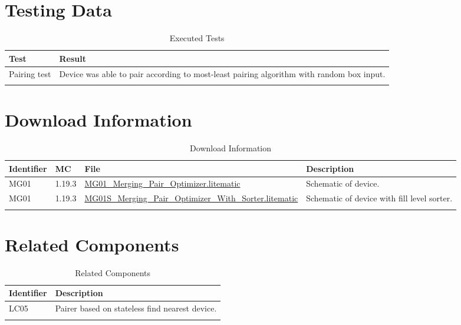 \documentclass[10pt]{datasheet}
\begin{document}
\section{Testing Data}
\begin{table}[h]
\caption{Executed Tests}
\begin{tabularx}{\textwidth}{l | X}
    \thickhline
    \textbf{Test} & \textbf{Result} \\
    \hline
    Pairing test & Device was able to pair according to most-least pairing algorithm with random box input. \\
    \thickhline
\end{tabularx}
\end{table}

\section{Download Information}
\begin{table}[h]
    \caption{Download Information}
    \begin{tabularx}{\textwidth}{l | l | l | X}
        \thickhline
        \textbf{Identifier} & \textbf{MC} & \textbf{File} & \textbf{Description} \\
        \hline
        MG01 & 1.19.3 & \href{https://github.com/Soontech-Annals/Archive/blob/364bde8dbcbc2e5337489ff435bcda9b387017e2/Archive/merging/MG01\%20Merging\%20Pair\%20Optimizer/MG01\_Merging\_Pair\_Optimizer.litematic?raw=1}{MG01\_Merging\_Pair\_Optimizer.litematic} & Schematic of device. \\
        \hline
        MG01 & 1.19.3 & \href{https://github.com/Soontech-Annals/Archive/blob/364bde8dbcbc2e5337489ff435bcda9b387017e2/Archive/merging/MG01\%20Merging\%20Pair\%20Optimizer/MG01S\_Merging\_Pair\_Optimizer\_With\_Sorter.litematic?raw=1}{MG01S\_Merging\_Pair\_Optimizer\_With\_Sorter.litematic} & Schematic of device with fill level sorter. \\
        \hline
        \thickhline
    \end{tabularx}
\end{table}

\newpage
\section{Related Components}
\begin{table}[h]
    \caption{Related Components}
    \begin{tabularx}{\textwidth}{ l | l }
        \thickhline
        \textbf{Identifier} & \textbf{Description} \\
        \hline
        LC05 & Pairer based on stateless find nearest device. \\
        \thickhline
    \end{tabularx}
\end{table}
\end{document}

